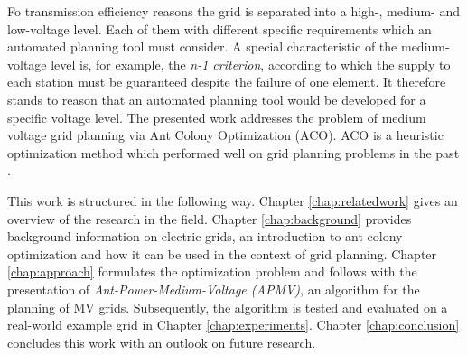 Fo transmission efficiency reasons the grid is separated into a high-, medium- and low-voltage level. Each of them with different specific requirements which an automated planning tool must consider. A special characteristic of the medium-voltage level is, for example, the \textit{n-1 criterion}, according to which the supply to each station must be guaranteed despite the failure of one element. It therefore stands to reason that an automated planning tool would be developed for a specific voltage level. The presented work addresses the problem of medium voltage grid planning via Ant Colony Optimization (ACO). ACO is a heuristic optimization method which performed well on grid planning problems in the past \cite{rotering2013zielnetzplanung}.

This work is structured in the following way. Chapter \ref{chap:relatedwork} gives an overview of the research in the field. Chapter \ref{chap:background} provides background information on electric grids, an introduction to ant colony optimization and how it can be used in the context of grid planning. Chapter \ref{chap:approach} formulates the optimization problem and follows with the presentation of \textit{Ant-Power-Medium-Voltage (APMV)}, an algorithm for the planning of MV grids. Subsequently, the algorithm is tested and evaluated on a real-world example grid in Chapter \ref{chap:experiments}. Chapter \ref{chap:conclusion} concludes this work with an outlook on future research.